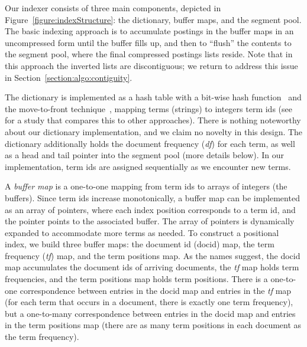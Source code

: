 Our indexer consists of three main components, depicted in Figure~\ref{figure:indexStructure}: the dictionary, buffer maps, and the segment pool. The basic indexing approach is to accumulate postings in the buffer maps in an uncompressed form until the buffer fills up, and then to ``flush'' the contents to the segment pool, where the final compressed postings lists reside. Note that in this approach the inverted lists are discontiguous; we return to address this issue in Section~\ref{section:algo:contiguity}.

The dictionary is implemented as a hash table with a bit-wise hash function~\cite{RamakrishnaDASFAA1997} and the move-to-front technique~\cite{WilliamsSPE2001}, mapping terms (strings) to integers term ids (see~\cite{ZobelIPL2001} for a study that compares this to other approaches). There is nothing noteworthy about our dictionary implementation, and we claim no novelty in this design. The dictionary additionally holds the document frequency (\textit{df}) for each term, as well as a head and tail pointer into the segment pool (more details below). In our implementation, term ids are assigned sequentially as we encounter new terms.

A \textit{buffer map} is a one-to-one mapping from term ids to arrays of integers (the buffers). Since term ids increase monotonically, a buffer map can be implemented as an array of pointers, where each index position corresponds to a term id, and the pointer points to the associated buffer. The array of pointers is dynamically expanded to accommodate more terms as needed. To construct a positional index, we build three buffer maps: the document id (docid) map, the term frequency (\textit{tf}) map, and the term positions map. As the names suggest, the docid map accumulates the document ids of arriving documents, the \textit{tf} map holds term frequencies, and the term positions map holds term positions. There is a one-to-one correspondence between entries in the docid map and entries in the \textit{tf} map (for each term that occurs in a document, there is exactly one term frequency), but a one-to-many correspondence between entries in the docid map and entries in the term positions map (there are as many 
term positions in each document as the term frequency).

